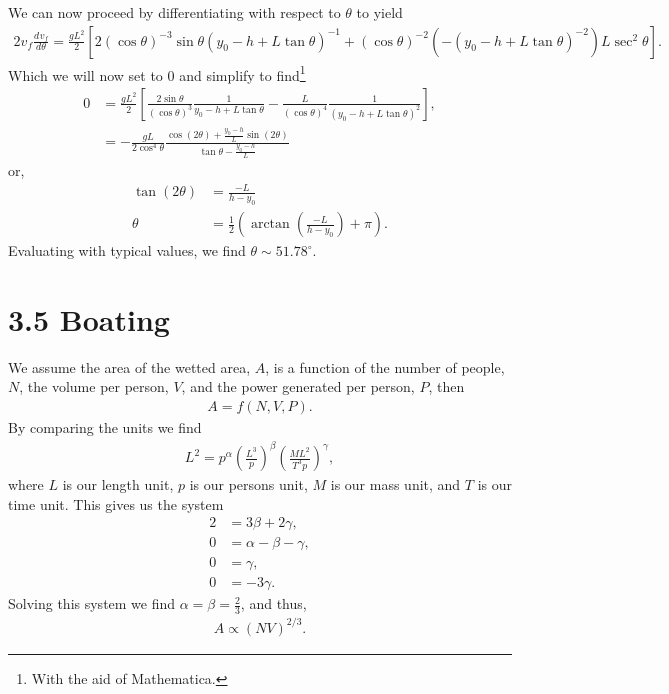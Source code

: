 \documentclass[12pt]{article}
\newcommand{\diff}[3][]{\frac{d^{#1}#2}{d{#3}^{#1}}}
\begin{document}
We can now proceed by differentiating with respect to $\theta$ to yield
\begin{align*}
2 v_f \diff{v_f}{\theta} = \frac{g L^2}{2} \left[ 2 \left( \cos \theta \right)^{-3} \sin \theta \left( y_0 - h + L \tan \theta \right)^{-1} + \left( \cos \theta \right)^{-2} \left( -\left( y_0 - h + L \tan \theta \right)^{-2} \right) L \sec^2 \theta \right].
\end{align*}
Which we will now set to 0 and simplify to find\footnote{With the aid of Mathematica.}
\begin{align*}
0 &= \frac{g L^2}{2} \left[ \frac{2 \sin \theta}{\left( \cos \theta \right)^{3}} \frac{1}{y_0 - h + L \tan \theta} - \frac{L}{\left( \cos \theta \right)^4} \frac{1}{\left( y_0 - h + L \tan \theta \right)^2} \right], \\
&= - \frac{gL}{2 \cos^4 \theta} \frac{\cos \left( 2 \theta \right) + \frac{y_0 - h}{L} \sin \left( 2 \theta \right)}{\tan \theta - \frac{y_0 - h}{L}}
\end{align*}
or,
\begin{align*}
\tan \left( 2 \theta \right) &= \frac{- L}{h - y_0} \\
\theta &= \frac{1}{2} \left( \arctan \left( \frac{-L}{h - y_0} \right) + \pi \right).
\end{align*}
Evaluating with typical values, we find $\theta \sim 51.78^\circ$.

\newpage

\section*{3.5 Boating}
We assume the area of the wetted area, $A$, is a function of the number of people, $N$, the volume per person, $V$, and the power generated per person, $P$, then
\begin{align*}
A = f(N, V, P).
\end{align*}
By comparing the units we find
\begin{align*}
L^2 = p^\alpha \left( \frac{L^3}{p} \right)^\beta \left( \frac{M L^2}{T^3 p} \right)^\gamma,
\end{align*}
where $L$ is our length unit, $p$ is our persons unit, $M$ is our mass unit, and $T$ is our time unit. This gives us the system
\begin{align*}
2 &= 3 \beta + 2 \gamma, \\
0 &= \alpha - \beta - \gamma, \\
0 &= \gamma, \\
0 &= -3\gamma.
\end{align*}
Solving this system we find $\alpha = \beta = \frac{2}{3}$, and thus,
\begin{align*}
A \propto \left( NV \right)^{2/3}.
\end{align*}
\end{document}
